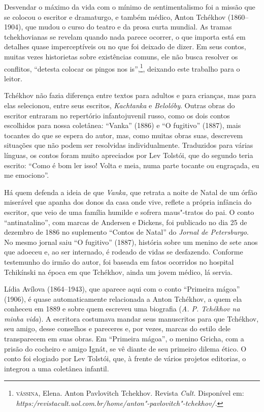 Desvendar o máximo da vida com o mínimo de sentimentalismo foi a missão
que se colocou o escritor e dramaturgo, e também médico, Аnton Tchékhov (1860--1904), que mudou o curso do teatro e da prosa curta mundial. As
tramas tchekhovianas se revelam quando nada parece ocorrer, o que
importa está em detalhes quase imperceptíveis ou no que foi deixado de
dizer. Em seus contos, muitas vezes historietas sobre existências
comuns, ele não busca resolver os conflitos, ``detesta colocar os pingos
nos is'',\footnote{\textsc{vássina}, Elena. Anton Pavlovitch Tchekhov. Revista
  \emph{Cult.} Disponível em:
  \emph{https:/revistacult.uol.com.br/home/anton"-pavlovitch"-tchekhov/}.}, deixando este trabalho para o leitor.

Tchékhov não fazia diferença entre textos para adultos e para crianças,
mas para elas selecionou, entre seus escritos, \emph{Kachtanka} e
\emph{Belolóby}. Outras obras do escritor entraram no repertório
infantojuvenil russo, como os dois contos escolhidos para nossa
coletânea: ``Vanka'' (1886) e ``O fugitivo''
(1887), mais tocantes do que se espera do autor, mas, como muitas
obras suas, descrevem situações que não podem ser resolvidas
individualmente. Traduzidos para várias línguas, os contos foram muito apreciados por Lev
Tolstói, que do segundo teria escrito: ``Como é bom ler isso! Volta e
meia, numa parte tocante ou engraçada, eu me emociono''.

Há quem defenda a ideia de que \emph{Vanka,} que retrata a noite de Natal
de um órfão miserável que apanha dos donos da casa onde vive, reflete a
própria infância do escritor, que veio de uma família humilde e sofrera
maus"-tratos do pai. O conto ``antinatalino'', com marcas de Andersen e
Dickens, foi publicado no dia 25 de dezembro de 1886 no suplemento
``Contos de Natal'' do \emph{Jornal de Petersburgo}. No mesmo jornal
saiu ``O fugitivo'' (1887), história sobre um menino de sete
anos que adoeceu e, ao ser internado, é rodeado de vidas se desfazendo.
Conforme testemunho do irmão do autor, foi baseada em fatos ocorridos no
hospital Tchikínski na época em que Tchékhov, ainda um jovem médico, lá
servia.

Lídia Avílova (1864--1943), que aparece aqui com o conto ``Primeira
mágoa'' (1906), é quase automaticamente relacionada a Anton Tchékhov, a
quem ela conheceu em 1889 e sobre quem escreveu uma biografia (\emph{A.
P. Tchékhov na minha vida}). A escritora costumava mandar seus
manuscritos para que Tchékhov, seu amigo, desse conselhos e pareceres e,
por vezes, marcas do estilo dele transparecem em suas obras. Em
``Primeira mágoa'', o menino Gricha, com a prisão do
cocheiro e amigo Ignát, se vê diante de seu primeiro dilema ético. O conto foi
elogiado por Lev Tolstói, que, à frente de vários projetos editorias, o
integrou a uma coletânea infantil.

